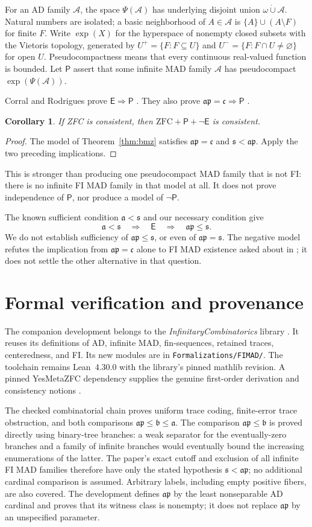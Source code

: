\documentclass[11pt,letterpaper]{article}
\newtheorem{corollary}[theorem]{Corollary}
\theoremstyle{definition}
\theoremstyle{remark}
\newcommand{\s}{\mathfrak{s}}
\newcommand{\bnum}{\mathfrak{b}}
\newcommand{\anum}{\mathfrak{a}}
\newcommand{\ap}{\mathfrak{ap}}
\newcommand{\cont}{\mathfrak{c}}
\newcommand{\A}{\mathcal{A}}
\newcommand{\E}{\mathsf{E}}
\newcommand{\PP}{\mathsf{P}}
\begin{document}
For an AD family $\A$, the space $\Psi(\A)$ has underlying disjoint union
$\omega\mathbin{\dot\cup}\A$. Natural numbers are isolated; a basic
neighborhood of $A\in\A$ is $\{A\}\cup(A\setminus F)$ for finite $F$.
Write $\exp(X)$ for the hyperspace of nonempty closed subsets with the
Vietoris topology, generated by $U^+=\{F:F\subseteq U\}$ and
$U^-=\{F:F\cap U\ne\varnothing\}$ for open $U$.
Pseudocompactness means that every continuous real-valued function is bounded.
Let $\PP$ assert that some infinite MAD family $\A$ has pseudocompact
$\exp(\Psi(\A))$.

Corral and Rodrigues prove $\E\Rightarrow\PP$ \cite[Proposition~2.5]{CR}.
They also prove $\ap=\cont\Rightarrow\PP$ \cite[Theorem~5]{CRnew}.
\begin{corollary}\label{cor:topology}
If ZFC is consistent, then $\mathrm{ZFC}+\PP+\neg\E$ is consistent.
\end{corollary}
\begin{proof}
The model of Theorem~\ref{thm:bmz} satisfies $\ap=\cont$ and $\s<\ap$.
Apply the two preceding implications.
\end{proof}
This is stronger than producing one pseudocompact MAD family that is not FI:
there is no infinite FI MAD family in that model at all. It does not prove
independence of $\PP$, nor produce a model of $\neg\PP$.

The known sufficient condition $\anum<\s$ and our necessary condition give
\[
 \anum<\s\quad\Longrightarrow\quad\E\quad\Longrightarrow\quad\ap\leq\s.
\]
We do not establish sufficiency of $\ap\leq\s$, or even of $\ap=\s$.
The negative model refutes the implication from $\ap=\cont$ alone to FI MAD
existence asked about in \cite[Question~7]{CRnew}; it does not settle the
other alternative in that question.

\section{Formal verification and provenance}\label{sec:formal}
The companion development belongs to the \emph{InfinitaryCombinatorics}
library \cite{IC}. It reuses its definitions of AD, infinite MAD,
fin-sequences, retained traces, centeredness, and FI. Its new modules are in
\texttt{Formalizations/FIMAD/}. The toolchain remains Lean~4.30.0 with the
library's pinned mathlib revision. A pinned YesMetaZFC dependency supplies
the genuine first-order derivation and consistency notions \cite{YM}.

The checked combinatorial chain proves uniform trace coding, finite-error
trace obstruction, and both comparisons $\ap\leq\bnum\leq\anum$.
The comparison $\ap\leq\bnum$ is proved directly using binary-tree branches:
a weak separator for the eventually-zero branches and a family of infinite
branches would eventually bound the increasing enumerations of the latter.
The paper's exact cutoff and exclusion of all infinite FI MAD families
therefore have only the stated hypothesis $\s<\ap$; no additional cardinal
comparison is assumed. Arbitrary labels, including empty positive fibers,
are also covered. The development defines
$\ap$ by the least nonseparable AD cardinal and proves that its witness class
is nonempty; it does not replace $\ap$ by an unspecified parameter.
\end{document}
